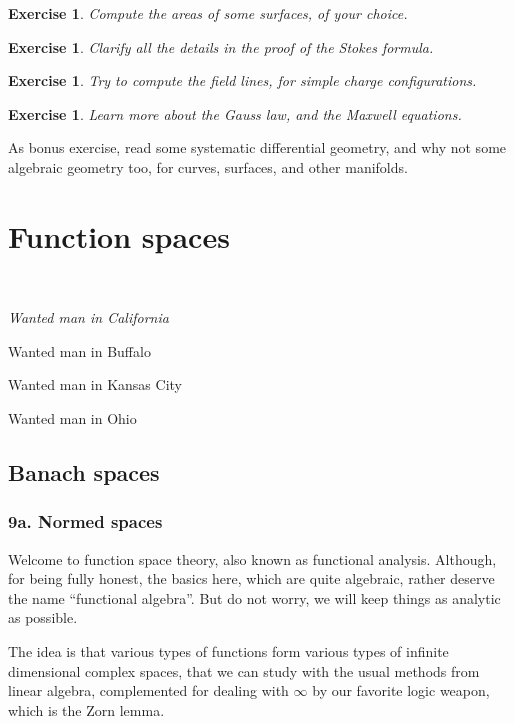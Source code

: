 \documentclass[12pt]{amsbook}
\newtheorem{exercise}[theorem]{Exercise}
\begin{document}
\begin{exercise}
Compute the areas of some surfaces, of your choice.
\end{exercise}

\begin{exercise}
Clarify all the details in the proof of the Stokes formula.
\end{exercise}

\begin{exercise}
Try to compute the field lines, for simple charge configurations.
\end{exercise}

\begin{exercise}
Learn more about the Gauss law, and the Maxwell equations.
\end{exercise}

As bonus exercise, read some systematic differential geometry, and why not some algebraic geometry too, for curves, surfaces, and other manifolds.

\part{Function spaces}

\ \vskip50mm

\begin{center}
{\em Wanted man in California

Wanted man in Buffalo

Wanted man in Kansas City

Wanted man in Ohio}
\end{center}

\chapter{Banach spaces}

\section*{9a. Normed spaces}

Welcome to function space theory, also known as functional analysis. Although, for being fully honest, the basics here, which are quite algebraic, rather deserve the name ``functional algebra''. But do not worry, we will keep things as analytic as possible.

\bigskip

The idea is that various types of functions form various types of infinite dimensional complex spaces, that we can study with the usual methods from linear algebra, complemented for dealing with $\infty$ by our favorite logic weapon, which is the Zorn lemma.
\end{document}
